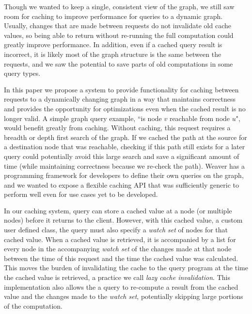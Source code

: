 \documentclass[letterpaper,twocolumn,11pt,tight]{article}
\begin{document}


Though we wanted to keep a single, consistent view of the graph, we still saw room for caching to improve performance for queries to a dynamic graph. Usually, changes that are made between requests do not invalidate old cache values, so being able to return without re-running the full computation could greatly improve performance.
In addition, even if a cached query result is incorrect, it is likely most of the graph structure is the same between the requests, and we saw the potential to save parts of old computations in some query types.

    In this paper we propose a system to provide functionality for caching between requests to a dynamically changing graph in a way that maintains correctness and provides the opportunity for optimizations even when the cached result is no longer valid.
A simple graph query example, ``is node $v$ reachable from node $u$", would benefit greatly from caching.
Without caching, this request requires a breadth or depth first search of the graph.
If we cached the path at the source for a destination node that was reachable, checking if this path still exists for a later query could potentially avoid this large search and save a significant amount of time (while maintaining correctness because we re-check the path).
Weaver has a programming framework for developers to define their own queries on the graph, and we wanted to expose a flexible caching API that was sufficiently generic to perform well even for use cases yet to be developed.

In our caching system, query can store a cached value at a node (or multiple nodes) before it returns to the client. However, with this cached value, a custom user defined class, the query must also specify a \emph{watch set} of nodes for that cached value.
When a cached value is retrieved, it is accompanied by a list for every node in the accompanying \emph{watch set} of the changes made at that node between the time of this request and the time the cached value was calculated.
This moves the burden of invalidating the cache to the query program at the time the cached value is retrieved, a practice we call \emph{lazy cache invalidation}.
This implementation also allows the a query to re-compute a result from the cached value and the changes made to the \emph{watch set}, potentially skipping large portions of the computation.
\end{document}
